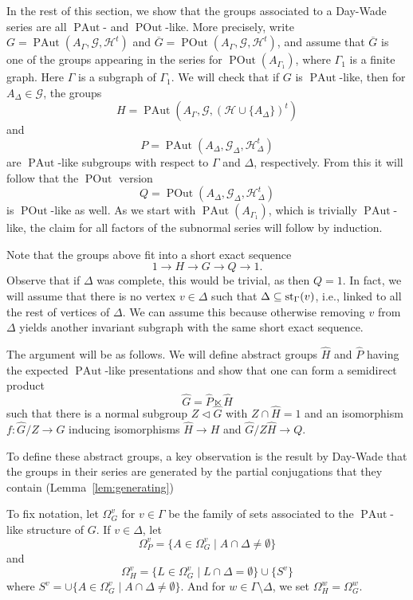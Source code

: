 \documentclass[10pt]{amsart}
\theoremstyle{definition}
\newcommand{\st}{{\rm st}}
\newcommand{\PAut}{\operatorname{PAut}}
\newcommand{\POut}{\operatorname {POut}}
\theoremstyle{definition}
\numberwithin{equation}{section}
\begin{document}
In the rest of this section, we show that the groups associated to a Day-Wade series are all $\PAut$- and $\POut$-like. More precisely, write $G = \PAut(A_\Gamma, \mathcal{G}, \mathcal{H}^t)$ and $\overline{G}=\POut(A_\Gamma,\mathcal{G},\mathcal{H}^t)$,
and assume that $\overline{G}$ is one of the groups appearing in the series for $\POut(A_{\Gamma_1})$, where $\Gamma_1$ is a finite graph.  Here $\Gamma$ is a subgraph of $\Gamma_1$. We will check that if $G$ is $\PAut$-like, then for $A_\Delta \in \mathcal{G}$, the groups
\[H=\PAut(A_\Gamma,\mathcal{G},(\mathcal{H}\cup\{A_\Delta\})^t)\]
and
\[P=\PAut(A_\Delta,\mathcal{G}_\Delta,\mathcal{H}_\Delta^t)\]
are $\PAut$-like subgroups with respect to $\Gamma$ and $\Delta$, respectively.
 From this it will follow that the $\POut$ version \[Q = \POut(A_\Delta,\mathcal{G}_\Delta,\mathcal{H}_\Delta^t)\] is $\POut$-like as well. As we start with $\PAut(A_{\Gamma_1})$, which is trivially $\PAut$-like, the claim for all factors of the subnormal series will follow by induction.

 Note that the groups above fit into a short exact sequence
 \[1\to H\to G\to Q\to 1.\]
Observe that if $\Delta$ was complete, this would be trivial, as then $Q=1$. In fact, we will assume that there is no vertex $v \in \Delta$ such that $\Delta \subseteq \st_\Gamma(v)$, i.e., linked to all the rest of vertices of $\Delta$. We can assume this because otherwise removing $v$ from $\Delta$ yields another invariant subgraph with the same short exact sequence.

The argument will be as follows. We will define abstract groups $\hat H$ and $\hat P$ having the expected $\PAut$-like presentations and show that one can form a semidirect product
\[\hat G=\hat P\ltimes\hat H\]
such that there is a normal subgroup $Z\triangleleft\hat G$ with $Z\cap\hat H=1$ and an isomorphism $f\colon\hat G/Z\to G$ inducing isomorphisms $\hat H\to H$ and $\hat G/Z\hat H\to Q$.

To define these abstract groups, a key observation is the result by Day-Wade that the groups in their series are generated by the partial conjugations that they contain (Lemma~\ref{lem:generating})

To fix notation, let $\Omega_G^v$ for $v\in\Gamma$ be the family of sets associated to the $\PAut$-like structure of $G$. If $v\in\Delta$, let
\[\Omega_P^v=\{A\in\Omega_G^v\mid A\cap\Delta\neq\emptyset\}\]
and
\[\Omega_H^v=\{L\in\Omega_G^v\mid L\cap\Delta=\emptyset\}\cup\{S^v\}\]
where $S^v=\cup\{A\in\Omega_G^v\mid A\cap\Delta\neq\emptyset\}$. And for $w\in\Gamma\setminus\Delta$, we set $\Omega_H^w=\Omega_G^w$.
\end{document}
